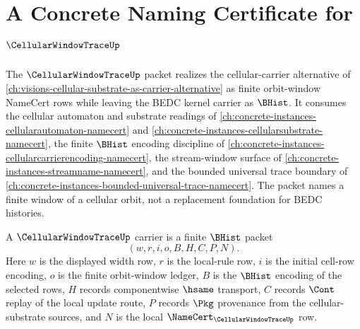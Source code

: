 \chapter{A Concrete Naming Certificate for $\CellularWindowTraceUp$}
\label{ch:concrete-instances-cellular-window-trace-namecert}

The $\CellularWindowTraceUp$ packet realizes the cellular-carrier alternative of \autoref{ch:visions-cellular-substrate-as-carrier-alternative} as finite orbit-window NameCert rows while leaving the BEDC kernel carrier as $\BHist$. It consumes the cellular automaton and substrate readings of \autoref{ch:concrete-instances-cellularautomaton-namecert} and \autoref{ch:concrete-instances-cellularsubstrate-namecert}, the finite $\BHist$ encoding discipline of \autoref{ch:concrete-instances-cellularcarrierencoding-namecert}, the stream-window surface of \autoref{ch:concrete-instances-streamname-namecert}, and the bounded universal trace boundary of \autoref{ch:concrete-instances-bounded-universal-trace-namecert}. The packet names a finite window of a cellular orbit, not a replacement foundation for BEDC histories.

\begin{definition}\label{def:cellular-window-trace-carrier}
A $\CellularWindowTraceUp$ carrier is a finite $\BHist$ packet
$$
(w,r,i,o,B,H,C,P,N).
$$
Here $w$ is the displayed width row, $r$ is the local-rule row, $i$ is the initial cell-row encoding, $o$ is the finite orbit-window ledger, $B$ is the $\BHist$ encoding of the selected rows, $H$ records componentwise $\hsame$ transport, $C$ records $\Cont$ replay of the local update route, $P$ records $\Pkg$ provenance from the cellular-substrate sources, and $N$ is the local $\NameCert_{\CellularWindowTraceUp}$ row.
\end{definition}

